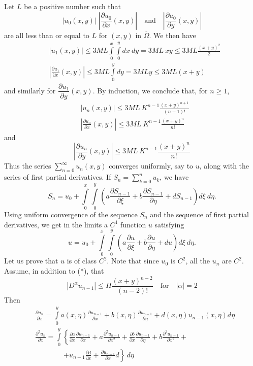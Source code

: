 Let $L$ be a positive number such that
$$
|u_{0}(x,y)|\;\left|\frac{\partial u_{0}}{\partial x}(x,y)\right|\quad\text{and}\quad \left|\frac{\partial u_{0}}{\partial y}(x,y)\right|
$$
are all less than or equal to $L$ for $(x,y)$ in $\overline{\Omega}$. We then have
\begin{align*}
& |u_{1}(x,y)| \leq 3ML \int\limits^{x}_{0}\int\limits^{y}_{0}dx \ dy = 3ML \ xy \leq 3ML \frac{(x+y)^{2}}{2}\\[3pt]
& \left|\frac{\partial u_{1}}{\partial x}(x,y)\right| \leq 3ML \int\limits^{y}_{0}dy = 3MLy\leq 3ML (x+y)
\end{align*}\pageoriginale
and similarly for $\dfrac{\partial u_{1}}{\partial y}(x,y)$. By induction, we conclude that, for $n\geq 1$,
\begin{align*}
& |u_{n}(x,y)| \leq 3ML \ K^{n-1}\frac{(x+y)^{n+1}}{(n+1)!}\\[3pt]
& \left|\frac{\partial u_{n}}{\partial x}(x,y)\right|\leq 3ML \ K^{n-1}\frac{(x+y)^{n}}{n!}
\end{align*}
and
$$
\left|\frac{\partial u_{n}}{\partial y}(x,y)\right|\leq 3ML \ K^{n-1}\frac{(x+y)^{n}}{n!}
$$
Thus the series $\sum\limits^{\infty}_{n=0}u_{n}(x,y)$ converges uniformly, say to $u$, along with the series of first partial derivatives. If $S_{n}=\sum\limits^{n}_{k=0}u_{k}$, we have
$$
S_{n}=u_{0}+\int\limits^{x}_{0}\int\limits^{y}_{0}\left(a\frac{\partial S_{n-1}}{\partial \xi}+b\frac{\partial S_{n-1}}{\partial \eta}+dS_{n-1}\right)d\xi \ d\eta.
$$
Using uniform convergence of the sequence $S_{n}$ and the sequence of first partial derivatives, we get in the limits a $C^{1}$ function $u$ satisfying
$$
u=u_{0}+\int\limits^{x}_{0}\int\limits^{y}_{0}\left(a\frac{\partial u}{\partial \xi}+b\frac{\partial u}{\partial \eta}+du\right)d\xi \ d\eta.
$$
Let us prove that $u$ is of class $C^{2}$. Note that since $u_{0}$ is $C^{2}$, all the $u_{n}$ are $C^{2}$. Assume, in addition to (*), that
$$
\left| D^{\alpha}u_{n-1}\right|\leq H \frac{(x+y)^{n-2}}{(n-2)!}\quad\text{for}\quad |\alpha|=2
$$
Then
\begin{align*}
& \frac{\partial u_{n}}{\partial x}=\int\limits^{y}_{0}a(x,\eta)\frac{\partial u_{n-1}}{\partial x}+b(x,\eta)\frac{\partial u_{n-1}}{\partial \eta}+d(x,\eta)u_{n-1}(x,\eta)d\eta\\[3pt]
& \frac{\partial^{2}u_{n}}{\partial x}=\int\limits^{y}_{0}\left\{\frac{\partial a}{\partial x}\frac{\partial u_{n-1}}{\partial x}+a\frac{\partial^{2}u_{n-1}}{\partial x^{2}}+\frac{\partial b}{\partial x}\frac{\partial u_{n-1}}{\partial \eta}+b\frac{\partial^{2}u_{n-1}}{\partial x^{2}}+\right.\\[3pt]
&\qquad\qquad \left. + u_{n-1}\frac{\partial d}{\partial x}+\frac{\partial u_{n-1}}{\partial x}d\right\}\,d\eta
\end{align*}\pageoriginale
